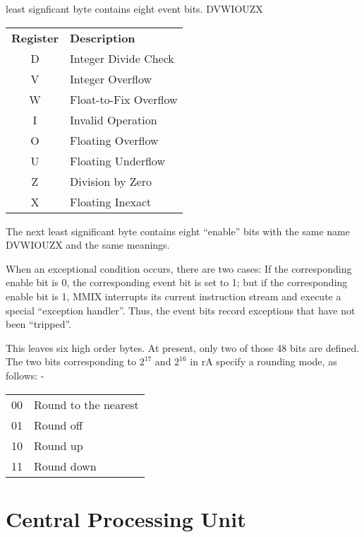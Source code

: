 \documentclass[a4paper,11pt]{report}
\newcommand{\head}[1]{\textbf{#1}}
\begin{document}
least signficant byte contains eight event bits. DVWIOUZX

\begin{center}
\begin{tabular}{ c l }
\head{Register} & \head{Description}\\
D & Integer Divide Check\\
V & Integer Overflow\\
W & Float-to-Fix Overflow\\
I & Invalid Operation\\
O & Floating Overflow\\
U & Floating Underflow\\
Z & Division by Zero\\
X & Floating Inexact\\
\end{tabular}
\end{center}

The next least significant byte contains eight ``enable'' bits with the same name DVWIOUZX and the same meanings.  

When an exceptional condition occurs, there are two cases: If the corresponding enable bit is 0, the corresponding event bit is set to 1; but if the corresponding enable bit is 1, MMIX interrupts its current instruction stream and execute a special ``exception handler''.  Thus, the event bits record exceptions that have not been ``tripped''.

This leaves six high order bytes.  At present, only  two of those 48 bits are defined. The two bits corresponding to 
\begin{math}
2^{17}
\end{math}
and 
\begin{math}
2^{16}
\end{math}
in rA specify a rounding mode, as follows: -

\begin{center}
\begin{tabular}{ c l }
00 & Round to the nearest\\
01 & Round off\\
10 & Round up\\
11 & Round down\\
\end{tabular}
\end{center}

\section{Central Processing Unit}
\end{document}
